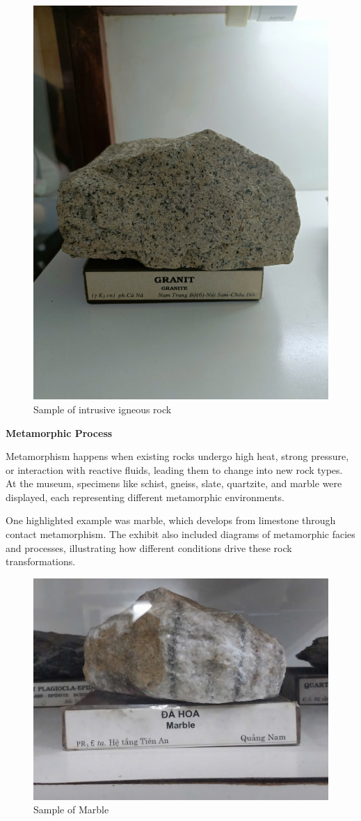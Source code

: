 \begin{figure}[H]
  \centering
  \includegraphics[max width=0.8\linewidth]{graphics/figure_07.jpg}
  \caption{Sample of intrusive igneous rock}
  \label{fig:intrusive-igneous}
\end{figure}

\textbf{Metamorphic Process}

Metamorphism happens when existing rocks undergo high heat, strong pressure, or interaction with reactive fluids, leading them to change into new rock types. At the museum, specimens like schist, gneiss, slate, quartzite, and marble were displayed, each representing different metamorphic environments.

One highlighted example was marble, which develops from limestone through contact metamorphism. The exhibit also included diagrams of metamorphic facies and processes, illustrating how different conditions drive these rock transformations.

\begin{figure}[H]
  \centering
  \includegraphics[max width=0.8\linewidth]{graphics/figure_08.jpg}
  \caption{Sample of Marble}
  \label{fig:marble}
\end{figure}

